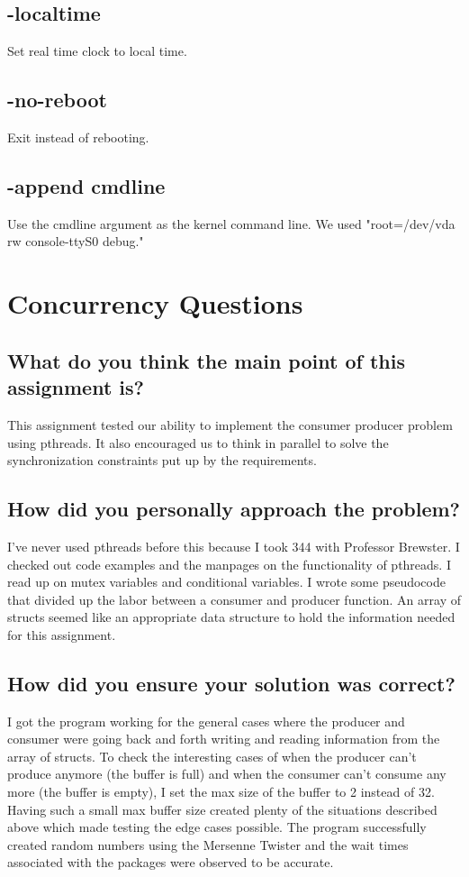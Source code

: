 \documentclass[letterpaper,
10pt, titlepage, draftclsnofoot, onecolumn]{IEEEtran}
\begin{document}
\subsection*{-localtime}
Set real time clock to local time.

\subsection*{-no-reboot}
Exit instead of rebooting.

\subsection*{-append cmdline}
Use the cmdline argument as the kernel command line. We used "root=/dev/vda rw console-ttyS0 debug."

\section*{Concurrency Questions}

\subsection*{What do you think the main point of this assignment is?}

This assignment tested our ability to implement the consumer producer problem using pthreads. It also encouraged us to think in parallel to solve the synchronization constraints put up by the requirements.

\subsection*{How did you personally approach the problem?}

I've never used pthreads before this because I took 344 with Professor Brewster. I checked out code examples \cite{stack} and the manpages on the functionality of pthreads. I read up on mutex variables and conditional variables. I wrote some pseudocode that divided up the labor between a consumer and producer function. An array of structs seemed like an appropriate data structure to hold the information needed for this assignment.

\subsection*{How did you ensure your solution was correct?}

I got the program working for the general cases where the producer and consumer were going back and forth writing and reading information from the array of structs. To check the interesting cases of when the producer can't produce anymore (the buffer is full) and when the consumer can't consume any more (the buffer is empty), I set the max size of the buffer to 2 instead of 32. Having such a small max buffer size created plenty of the situations described above which made testing the edge cases possible. The program successfully created random numbers using the Mersenne Twister and the wait times associated with the packages were observed to be accurate.
\end{document}
